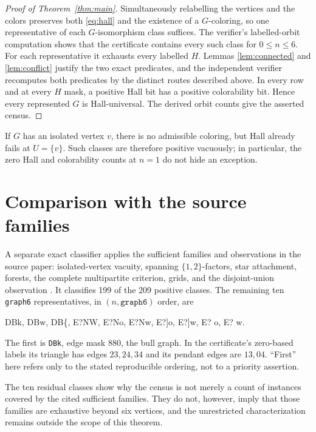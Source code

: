\documentclass[11pt]{article}
\begin{document}
\begin{proof}[Proof of Theorem~\ref{thm:main}]
Simultaneously relabelling the vertices and the colors preserves both
\eqref{eq:hall} and the existence of a $G$-coloring, so one representative of
each $G$-isomorphism class suffices.  The verifier's labelled-orbit computation
shows that the certificate contains every such class for $0\leq n\leq6$.
For each representative it exhausts every labelled $H$.  Lemmas
\ref{lem:connected} and \ref{lem:conflict} justify the two exact predicates,
and the independent verifier recomputes both predicates by the distinct routes
described above.  In every row and at every $H$ mask, a positive Hall bit has a
positive colorability bit.  Hence every represented $G$ is Hall-universal.
The derived orbit counts give the asserted census.
\end{proof}

If $G$ has an isolated vertex $v$, there is no admissible coloring, but Hall
already fails at $U=\{v\}$.  Such classes are therefore positive vacuously;
in particular, the zero Hall and colorability counts at $n=1$ do not hide an
exception.

\section{Comparison with the source families}

A separate exact classifier applies the sufficient families and observations
in the source paper: isolated-vertex vacuity, spanning $\{1,2\}$-factors,
star attachment, forests, the complete multipartite criterion, grids, and the
disjoint-union observation \cite{Chalise2026}.  It classifies 199 of the 209
positive classes.  The remaining ten \texttt{graph6} representatives, in
$(n,\texttt{graph6})$ order, are
\begin{center}
\small\ttfamily
DBk, DBw, DB\{, E?NW, E?No, E?Nw, E?]o, E?]w, E? o, E? w.
\end{center}
The first is \texttt{DBk}, edge mask $880$, the bull graph.  In the certificate's
zero-based labels its triangle has edges $23,24,34$ and its pendant edges are
$13,04$.  ``First'' here refers only to the stated reproducible ordering, not
to a priority assertion.

The ten residual classes show why the census is not merely a count of instances
covered by the cited sufficient families.  They do not, however, imply that
those families are exhaustive beyond six vertices, and the unrestricted
characterization remains outside the scope of this theorem.
\end{document}
